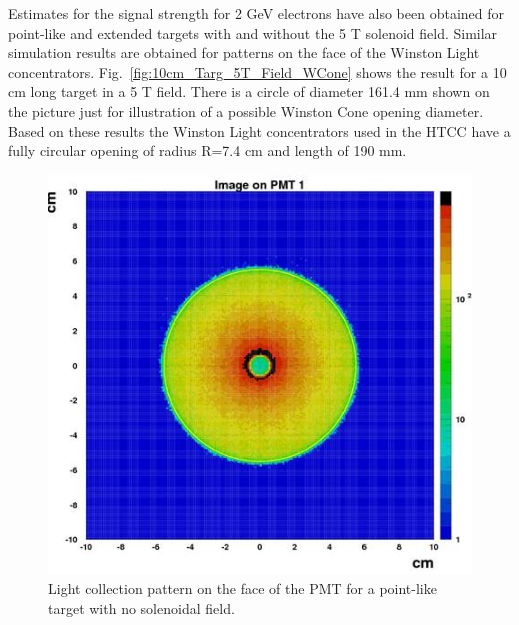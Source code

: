 Estimates for the signal strength for 2 GeV electrons have also been obtained for point-like and extended targets with and without the 5 T solenoid field. Similar simulation results are obtained for patterns on the face of the Winston Light concentrators. Fig.~\ref{fig:10cm_Targ_5T_Field_WCone} shows the result for a 10 cm long target in a 5 T field. There is a circle of diameter 161.4 mm shown on the picture just for illustration of a possible Winston Cone opening diameter. Based on these results the Winston Light concentrators used in the HTCC have a fully circular opening of radius R=7.4 cm and length of 190 mm. 

\begin{figure}[!ht]
    \centering
    \includegraphics[width=1.0\linewidth,trim={0.0cm 0.0cm 0.0cm 0.0cm},clip]{images/Point_Targ_Zero_Field_PMT.jpg}
    \caption{Light collection pattern on the face of the PMT for a point-like target with no solenoidal field.}
    \label{fig:Point_Targ_Zero_Field_PMT}
\end{figure}

